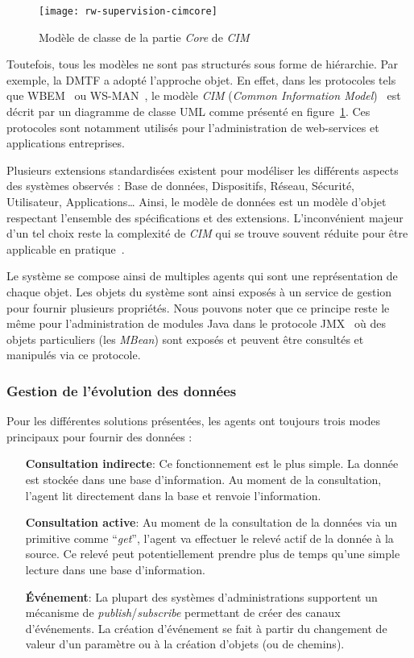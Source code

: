 \begin{figure}[ht]
    \centering
    \texttt{[image: rw-supervision-cimcore]}
    \caption{Modèle de classe de la partie \textit{Core} de \textit{CIM}}\label{fig:rw:supervision:cimcore}
\end{figure}
Toutefois, tous les modèles ne sont pas structurés sous forme de hiérarchie. Par exemple, la DMTF a adopté l'approche objet. En effet, dans les protocoles tels que WBEM~\cite{DMTF:WBEM} ou WS-MAN~\cite{DMTF:WS-MAN}, le modèle \textit{CIM} (\textit{Common Information Model})~\cite{DMTF:CIM} est décrit par un diagramme de classe UML comme présenté en figure~\ref{fig:rw:supervision:cimcore}. Ces protocoles sont notamment utilisés pour l'administration de web-services et applications entreprises. 

Plusieurs extensions standardisées existent pour modéliser les différents aspects des systèmes observés : Base de données, Dispositifs, Réseau, Sécurité, Utilisateur, Applications\dots{} Ainsi, le modèle de données est un modèle d'objet respectant l'ensemble des spécifications et des extensions. L'inconvénient majeur d'un tel choix reste la complexité de \textit{CIM} qui se trouve souvent réduite pour être applicable en pratique~\cite{Lopez:datacenter}.

Le système se compose ainsi de multiples agents qui sont une représentation de chaque objet. Les objets du système sont ainsi exposés à un service de gestion pour fournir plusieurs propriétés. Nous pouvons noter que ce principe reste le même pour l'administration de modules Java dans le protocole JMX~\cite{Sun:JMX} où des objets particuliers (les \textit{MBean}) sont exposés et peuvent être consultés et manipulés via ce protocole.

\subsubsection{Gestion de l'évolution des données}
Pour les différentes solutions présentées, les agents ont toujours trois modes principaux pour fournir des données :
\begin{itemize}
	\item[\textbf{Consultation indirecte}: ] Ce fonctionnement est le plus simple. La donnée est stockée dans une base d'information. Au moment de la consultation, l'agent lit directement dans la base et renvoie l'information.
	\item[\textbf{Consultation active}: ] Au moment de la consultation de la données via un primitive comme \enquote{\it get}, l'agent va effectuer le relevé actif de la donnée à la source. Ce relevé peut potentiellement prendre plus de temps qu'une simple lecture dans une base d'information.
	\item[\textbf{Événement}: ] La plupart des systèmes d'administrations supportent un mécanisme de \textit{publish}/\textit{subscribe} permettant de créer des canaux d'événements. La création d'événement se fait à partir du changement de valeur d'un paramètre ou à la création d'objets (ou de chemins).
\end{itemize}

